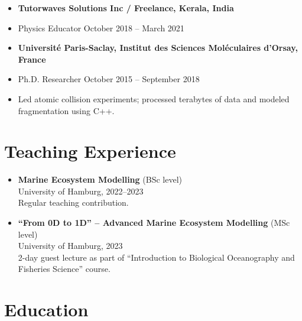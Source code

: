 \documentclass[margin,line,pifont,palatino,courier]{res}
\begin{document}
\begin{resume}
\begin{itemize}
\item {\bf Tutorwaves Solutions Inc / Freelance, Kerala, India}\\
\vspace*{-.2in}
\item[] Physics Educator \hfill October 2018 -- March 2021
\end{itemize}
\vspace*{.03in}

\begin{itemize}
\item {\bf Universit\'e Paris-Saclay, Institut des Sciences Mol\'eculaires d'Orsay, France}\\
\vspace*{-.2in}
\item[] Ph.D. Researcher \hfill October 2015 -- September 2018
\vspace*{.03in}
\item[-] Led atomic collision experiments; processed terabytes of data and modeled fragmentation using C++.
\end{itemize}

\section{\sc Teaching Experience}

\begin{itemize}
\item {\bf Marine Ecosystem Modelling} (BSc level)\\
University of Hamburg, 2022--2023\\
Regular teaching contribution.

\vspace*{.03in}
\item {\bf ``From 0D to 1D'' -- Advanced Marine Ecosystem Modelling} (MSc level)\\
University of Hamburg, 2023\\
2-day guest lecture as part of ``Introduction to Biological Oceanography and Fisheries Science'' course.
\end{itemize}

\section{\sc Education}


\end{resume}
\end{document}
